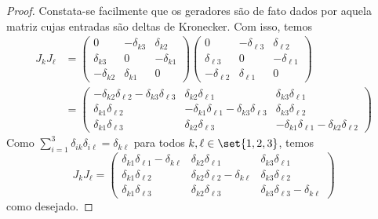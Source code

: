 \begin{proof}
    Constata-se facilmente que os geradores são de fato dados por aquela matriz cujas entradas são deltas de Kronecker. Com isso, temos
    \begin{align*}
        J_kJ_\ell &=
        \begin{pmatrix}
            0 & -\delta_{k3} & \delta_{k2}\\
            \delta_{k3} & 0 & -\delta_{k1}\\
            -\delta_{k2} & \delta_{k1} & 0
        \end{pmatrix}
        \begin{pmatrix}
            0 & -\delta_{\ell 3} & \delta_{\ell 2}\\
            \delta_{\ell 3} & 0 & -\delta_{\ell 1}\\
            -\delta_{\ell 2} & \delta_{\ell 1} & 0
        \end{pmatrix}\\
                  &=
        \begin{pmatrix}
            -\delta_{k2}\delta_{\ell2} - \delta_{k3}\delta_{\ell3} & \delta_{k2} \delta_{\ell 1} & \delta_{k3} \delta_{\ell 1}\\
            \delta_{k1} \delta_{\ell2} & -\delta_{k1}\delta_{\ell1} - \delta_{k3}\delta_{\ell3}  & \delta_{k3} \delta_{\ell 2}\\
            \delta_{k1} \delta_{\ell3} & \delta_{k2} \delta_{\ell 3} & -\delta_{k1}\delta_{\ell1} - \delta_{k2}\delta_{\ell2}
        \end{pmatrix}
    \end{align*}
    Como \(\sum_{i = 1}^3 \delta_{ik} \delta_{i\ell} = \delta_{k\ell}\) para todos \(k, \ell \in \set{1,2,3}\), temos
    \begin{equation*}
        J_k J_\ell = \begin{pmatrix}
            \delta_{k1}\delta_{\ell 1} - \delta_{k\ell} & \delta_{k2} \delta_{\ell 1} & \delta_{k3} \delta_{\ell 1}\\
            \delta_{k1} \delta_{\ell2} & \delta_{k2} \delta_{\ell 2} - \delta_{k \ell} & \delta_{k3} \delta_{\ell 2}\\
            \delta_{k1} \delta_{\ell3} & \delta_{k2} \delta_{\ell 3} & \delta_{k3}\delta_{\ell 3} - \delta_{k\ell}
        \end{pmatrix}
    \end{equation*}
    como desejado.
\end{proof}

